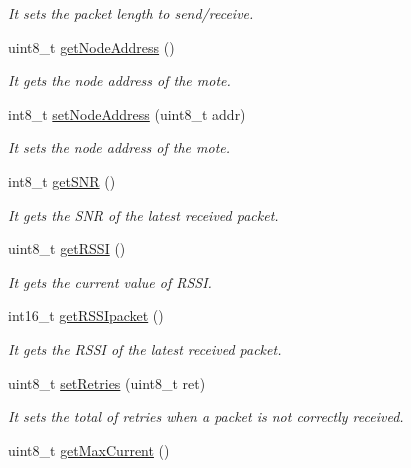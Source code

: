 \begin{DoxyCompactItemize}
\begin{DoxyCompactList}\small\item\em It sets the packet length to send/receive. \end{DoxyCompactList}\item 
uint8\+\_\+t \hyperlink{class_wasp_s_x1272_aa8fb06f141d2a1eb0c4524479370c6c5}{get\+Node\+Address} ()
\begin{DoxyCompactList}\small\item\em It gets the node address of the mote. \end{DoxyCompactList}\item 
int8\+\_\+t \hyperlink{class_wasp_s_x1272_a17343af90b0d4680acdd73acaf3eb20e}{set\+Node\+Address} (uint8\+\_\+t addr)
\begin{DoxyCompactList}\small\item\em It sets the node address of the mote. \end{DoxyCompactList}\item 
int8\+\_\+t \hyperlink{class_wasp_s_x1272_a0d168248aaeec82271ae59ad9a329680}{get\+S\+NR} ()
\begin{DoxyCompactList}\small\item\em It gets the S\+NR of the latest received packet. \end{DoxyCompactList}\item 
uint8\+\_\+t \hyperlink{class_wasp_s_x1272_a12f88056421b8cfe367cd7edf675c2a5}{get\+R\+S\+SI} ()
\begin{DoxyCompactList}\small\item\em It gets the current value of R\+S\+SI. \end{DoxyCompactList}\item 
int16\+\_\+t \hyperlink{class_wasp_s_x1272_a08509541a70726549edefa3a4d851f59}{get\+R\+S\+S\+Ipacket} ()
\begin{DoxyCompactList}\small\item\em It gets the R\+S\+SI of the latest received packet. \end{DoxyCompactList}\item 
uint8\+\_\+t \hyperlink{class_wasp_s_x1272_aa4080fc70f853968a90830db5e98c676}{set\+Retries} (uint8\+\_\+t ret)
\begin{DoxyCompactList}\small\item\em It sets the total of retries when a packet is not correctly received. \end{DoxyCompactList}\item 
uint8\+\_\+t \hyperlink{class_wasp_s_x1272_a8dbdb367b9129c69a82bbb002799f34f}{get\+Max\+Current} ()

\end{DoxyCompactItemize}
